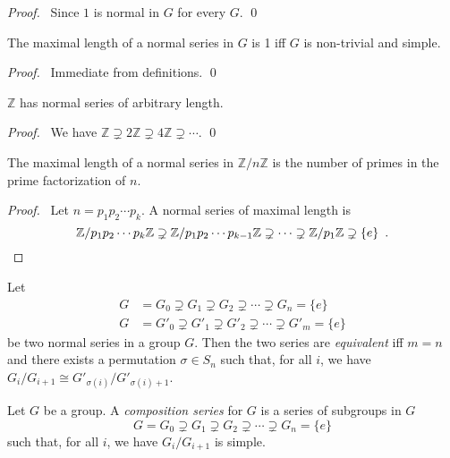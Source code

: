 \begin{proof}
\pf\ Since $1$ is normal in $G$ for every $G$. \qed
\end{proof}

\begin{prop}
The maximal length of a normal series in $G$ is 1 iff $G$ is non-trivial and simple.
\end{prop}

\begin{proof}
\pf\ Immediate from definitions. \qed
\end{proof}

\begin{ex}
$\mathbb{Z}$ has normal series of arbitrary length.
\end{ex}

\begin{proof}
\pf\ We have $\mathbb{Z} \supsetneq 2 \mathbb{Z} \supsetneq 4 \mathbb{Z} \supsetneq \cdots$. \qed
\end{proof}

\begin{ex}
The maximal length of a normal series in $\mathbb{Z} / n \mathbb{Z}$ is the number of primes in the prime factorization of $n$.
\end{ex}

\begin{proof}
\pf\ Let $n = p_1 p_2 \cdots p_k$. A normal series of maximal length is
\[ \mathbb{Z} / p_1 p_2 \cdots p_k \mathbb{Z} \supsetneq \mathbb{Z} / p_1 p_2 \cdots p_{k-1} \mathbb{Z} \supsetneq \cdots \supsetneq \mathbb{Z} / p_1 \mathbb{Z} \supsetneq \{e\} \enspace . \qed \]
\end{proof}

\begin{df}
Let
\begin{align*}
G & = G_0 \supsetneq G_1 \supsetneq G_2 \supsetneq \cdots \supsetneq G_n = \{e\} \\
G & = G'_0 \supsetneq G'_1 \supsetneq G'_2 \supsetneq \cdots \supsetneq G'_m = \{e\}
\end{align*}
be two normal series in a group $G$. Then the two series are \emph{equivalent} iff $m = n$ and there exists a permutation $\sigma \in S_n$ such that, for all $i$, we have $G_i / G_{i+1} \cong G'_{\sigma(i)} / G'_{\sigma(i) + 1}$.
\end{df}

\begin{df}
Let $G$ be a group. A \emph{composition series} for $G$ is a series of subgroups in $G$
\[ G = G_0 \supsetneq G_1 \supsetneq G_2 \supsetneq \cdots \supsetneq G_n = \{e\} \]
such that, for all $i$, we have $G_i / G_{i+1}$ is simple.
\end{df}

